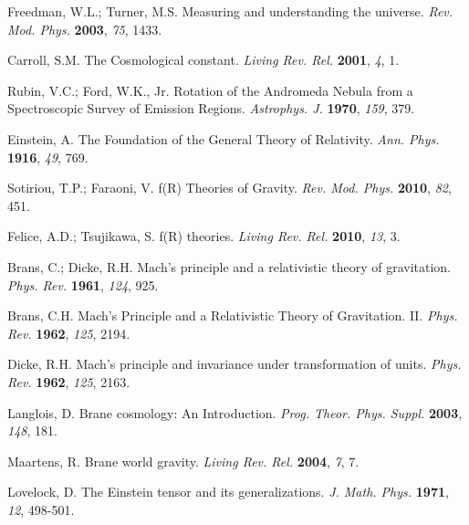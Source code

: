 \documentclass[aps,amsmath,amssymb,twocolumn]{revtex4}
\begin{document}
\begin{thebibliography}{999}

 Freedman, W.L.; Turner, M.S. 
  Measuring and understanding the universe.
  \emph{Rev. Mod. Phys.}  \textbf{2003}, {\em 75}, 1433.

 Carroll, S.M.  
  The Cosmological constant.
  \emph{Living Rev. Rel.} \textbf{2001}, {\em 4}, 1.

 Rubin, V.C.; Ford, W.K., Jr. 
  Rotation of the Andromeda Nebula from a Spectroscopic Survey of Emission Regions.
  \emph{Astrophys. J.}   \textbf{1970}, {\em 159}, 379.

 Einstein, A. 
  The Foundation of the General Theory of Relativity.
  \emph{Ann. Phys.} \textbf{1916},  {\em 49},  769.

 Sotiriou, T.P.; Faraoni, V. 
  f(R) Theories of Gravity.
  \emph{Rev. Mod. Phys.}  \textbf{2010}, {\em 82}, 451.

 Felice, A.D.; Tsujikawa, S. 
f(R) theories.
\emph{Living Rev. Rel.} \textbf{2010}, \emph{13}, 3.

 Brans, C.; Dicke, R.H.  
  Mach's principle and a relativistic theory of gravitation.
  \emph{Phys. Rev.}  \textbf{1961}, {\em 124}, 925.

  Brans, C.H. 
  Mach's Principle and a Relativistic Theory of Gravitation. II.
  \emph{Phys. Rev.}   \textbf{1962}, {\em 125}, 2194.

  Dicke, R.H.  
  Mach's principle and invariance under transformation of units.
  \emph{Phys. Rev.}   \textbf{1962}, {\em 125}, 2163.


 Langlois, D. 
  Brane cosmology: An Introduction.
  \emph{Prog. Theor. Phys. Suppl.}  \textbf{2003}, {\em 148}, 181.

 Maartens, R. 
Brane world gravity.
\emph{Living Rev. Rel.} \textbf{2004}, \emph{7}, 7.

 Lovelock, D.  
The Einstein tensor and its generalizations.
\emph{J. Math. Phys.} \textbf{1971}, \emph{12}, 498-501.


\end{thebibliography}
\end{document}
